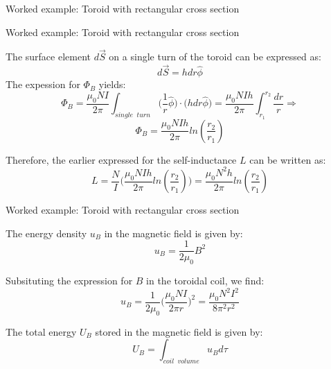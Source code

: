 {\begin{frame}{Worked example: Toroid with rectangular cross section}
\end{frame}

%
%
%

\begin{frame}{Worked example: Toroid with rectangular cross section}

  The surface element $d\vec{S}$ on a single turn of the toroid
  can be expressed as:
  \begin{equation*}
    d\vec{S} = h dr \hat{\phi}
  \end{equation*}
  The expession for $\Phi_B$ yields:
  \begin{equation*}
    \Phi_B = \frac{\mu_0 NI}{2\pi} \int_{single\;\;turn} \Big( \frac{1}{r} \hat{\phi} \Big) \cdot \Big( h dr \hat{\phi} \Big)
           = \frac{\mu_0 NI h}{2\pi} \int_{r_1}^{r_2} \frac{dr}{r} \Rightarrow
  \end{equation*}
  \begin{equation*}
    \Phi_B = \frac{\mu_0 NI h}{2\pi} ln(\frac{r_2}{r_1})
  \end{equation*}

  Therefore, the earlier expressed for the self-inductance $L$ can be written as:
  \begin{equation*}
    L = \frac{N}{I} \Big( \frac{\mu_0 NI h}{2\pi} ln(\frac{r_2}{r_1}) \Big)
      = \frac{\mu_0 N^2 h}{2\pi} ln(\frac{r_2}{r_1})
  \end{equation*}

\end{frame}

%
%
%

\begin{frame}{Worked example: Toroid with rectangular cross section}

  The energy density $u_B$ in the magnetic field is given by:
  \begin{equation*}
    u_B = \frac{1}{2\mu_0} B^2
  \end{equation*}

  Subsituting the expression for $B$ in the toroidal coil, we find:
  \begin{equation*}
    u_B = \frac{1}{2\mu_0} \Big( \frac{\mu_0 NI}{2\pi r} \Big)^2
        = \frac{\mu_0 N^2 I^2}{8\pi^2 r^2}
  \end{equation*}

  The total energy $U_B$ stored in the magnetic field is given by:
  \begin{equation*}
    U_B = \int_{coil\;\;volume} u_B d\tau
  \end{equation*}


\end{frame}}
